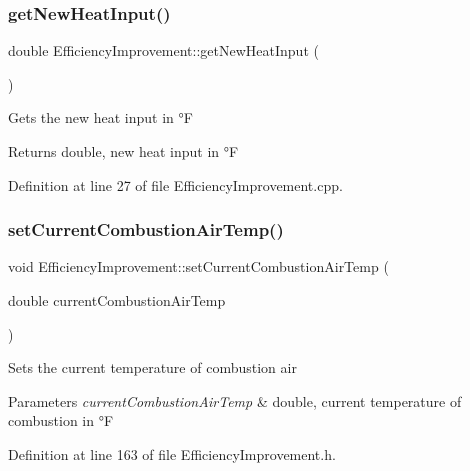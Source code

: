 \subsubsection{\texorpdfstring{get\+New\+Heat\+Input()}{getNewHeatInput()}\hspace{0.1cm}{\footnotesize\ttfamily [3/3]}}
{\footnotesize\ttfamily double Efficiency\+Improvement\+::get\+New\+Heat\+Input (\begin{DoxyParamCaption}{ }\end{DoxyParamCaption})}

Gets the new heat input in °F

\begin{DoxyReturn}{Returns}
double, new heat input in °F 
\end{DoxyReturn}


Definition at line 27 of file Efficiency\+Improvement.\+cpp.

\mbox{\label{class_efficiency_improvement_a2fba09e47828dd8e6278251be8d1fa72}} 
\subsubsection{\texorpdfstring{set\+Current\+Combustion\+Air\+Temp()}{setCurrentCombustionAirTemp()}\hspace{0.1cm}{\footnotesize\ttfamily [1/3]}}
{\footnotesize\ttfamily void Efficiency\+Improvement\+::set\+Current\+Combustion\+Air\+Temp (\begin{DoxyParamCaption}\item[{double}]{current\+Combustion\+Air\+Temp }\end{DoxyParamCaption})\hspace{0.3cm}{\ttfamily [inline]}}

Sets the current temperature of combustion air


\begin{DoxyParams}{Parameters}
{\em current\+Combustion\+Air\+Temp} & double, current temperature of combustion in °F \\
\hline
\end{DoxyParams}


Definition at line 163 of file Efficiency\+Improvement.\+h.

